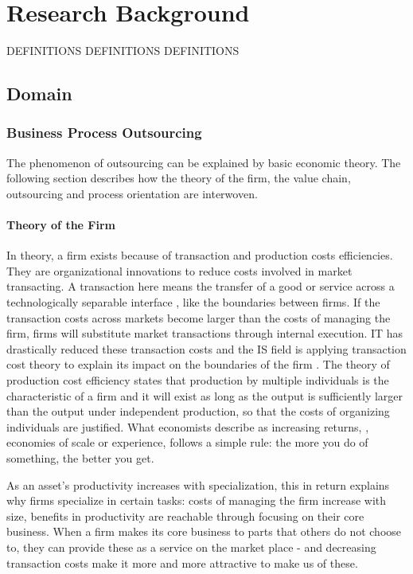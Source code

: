 
\chapter{Research Background}
	DEFINITIONS DEFINITIONS DEFINITIONS
	\section{Domain}
		\subsection{Business Process Outsourcing}
		The phenomenon of outsourcing can be explained by basic economic theory. The following section describes how the theory of the firm, the value chain, outsourcing and process orientation are interwoven. 
		
		
		\subsubsection{Theory of the Firm}
		In theory, a firm exists because of transaction and production costs efficiencies. They are organizational innovations to reduce costs involved in market transacting. A transaction here means the transfer of a good or service across a technologically separable interface \citep{williamson1981economics, williamson1971vertical}, like the boundaries between firms. If the transaction costs across markets become larger than the costs of managing the firm, firms will substitute market transactions through internal execution. IT has drastically reduced these transaction costs and the IS field is applying transaction cost theory to explain its impact on the boundaries of the firm \citep{aron2005just}.
		The theory of production cost efficiency states that production by multiple individuals is the characteristic of a firm \citep{alchian1972production} and it will exist as long as the output is sufficiently larger than the output under independent production, so that the costs of organizing individuals are justified. What economists describe as increasing returns, \ie, economies of scale or experience, follows a simple rule: the more you do of something, the better you get. 
		
		As an asset's productivity increases with specialization, this in return explains why firms specialize in certain tasks: costs of managing the firm increase with size,  benefits in productivity are reachable through focusing on their core business.
		When a firm makes its core business to parts that others do not choose to, they can provide these as a service on the market place - and decreasing transaction costs make it more and more attractive to make us of these. 
		
